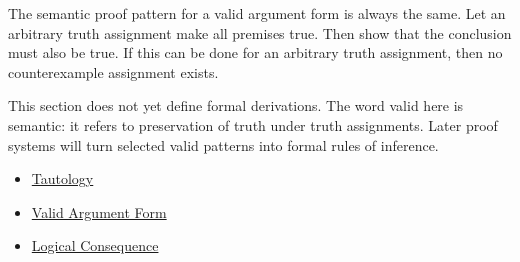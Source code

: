 \begin{remark*}[Exposition]
The semantic proof pattern for a valid argument form is always the same. Let an
arbitrary truth assignment make all premises true. Then show that the conclusion
must also be true. If this can be done for an arbitrary truth assignment, then no
counterexample assignment exists.
\end{remark*}

\begin{remark*}[Exposition]
This section does not yet define formal derivations. The word valid here is
semantic: it refers to preservation of truth under truth assignments. Later proof
systems will turn selected valid patterns into formal rules of inference.
\end{remark*}

\begin{dependencies}
\begin{itemize}
  \item \hyperref[def:tautology-propositional-logic]{Tautology}
  \item \hyperref[def:valid-argument-form-propositional-logic]{Valid Argument Form}
  \item \hyperref[def:logical-consequence-propositional-logic]{Logical Consequence}
\end{itemize}
\end{dependencies}

